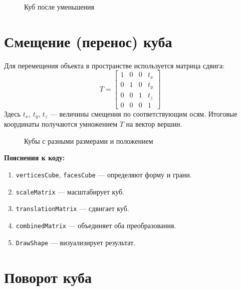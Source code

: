 \begin{figure}[h!]
    \centering
    \caption{Куб после уменьшения}
\end{figure}

\section{Смещение (перенос) куба}

Для перемещения объекта в пространстве используется матрица сдвига:
\[
T = \begin{bmatrix}
    1 & 0 & 0 & t_x \\
    0 & 1 & 0 & t_y \\
    0 & 0 & 1 & t_z \\
    0 & 0 & 0 & 1
\end{bmatrix}
\]
Здесь $t_x$, $t_y$, $t_z$ --- величины смещения по соответствующим осям. Итоговые координаты получаются умножением $T$ на вектор вершин.

\begin{figure}[h!]
    \centering
    \caption{Кубы с разными размерами и положением}
\end{figure}

\textbf{Пояснения к коду:}
\begin{enumerate}
    \item \texttt{verticesCube}, \texttt{facesCube} --- определяют форму и грани.
    \item \texttt{scaleMatrix} --- масштабирует куб.
    \item \texttt{translationMatrix} --- сдвигает куб.
    \item \texttt{combinedMatrix} --- объединяет оба преобразования.
    \item \texttt{DrawShape} --- визуализирует результат.
\end{enumerate}

\section{Поворот куба}

